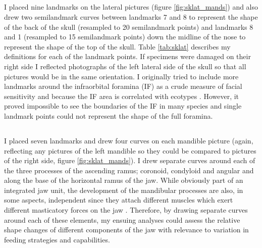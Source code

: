 \subsection{}
	I placed nine landmarks on the lateral pictures (figure \ref{fig:sklat_mands}) and also drew two semilandmark curves between landmarks 7 and 8 to represent the shape of the back of the skull (resampled to 20 semilandmark points) and landmarks 8 and 1 (resampled to 15 semilandmark points) down the midline of the nose to represent the shape of the top of the skull. Table \ref{tab:sklat} describes my definitions for each of the landmark points.
	If specimens were damaged on their right side I reflected photographs of the left lateral side of the skull so that all pictures would be in the same orientation.
	I originally tried to include more landmarks around the infraorbital foramina (IF) as a crude measure of facial sensitivity and because the IF area is correlated with ecotypes \citep{Crumpton2012}. However, it proved impossible to see the boundaries of the IF in many species and single landmark points could not represent the shape of the full foramina. 

\subsection{}
	I placed seven landmarks and drew four curves on each mandible picture (again, reflecting any pictures of the left mandible so they could be compared to pictures of the right side, figure \ref{fig:sklat_mands}). I drew separate curves around each of the three processes of the ascending ramus; coronoid, condyloid and angular and along the base of the horizontal ramus of the jaw. While obviously part of an integrated jaw unit, the development of the mandibular processes are also, in some aspects, independent since they attach different muscles which exert different masticatory forces on the jaw \citep{Barrow2008}. Therefore, by drawing separate curves around each of these elements, my ensuing analyses could assess the relative shape changes of different components of the jaw with relevance to variation in feeding strategies and capabilities.




